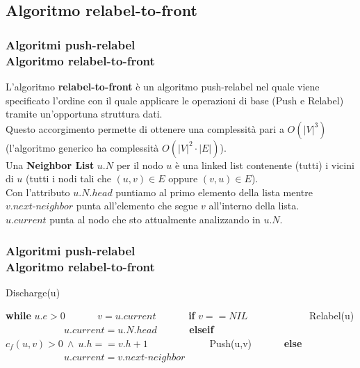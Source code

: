\documentclass{beamer}
\begin{document}
\subsection{Algoritmo relabel-to-front}

\begin{frame}
\frametitle{Algoritmi push-relabel\\Algoritmo relabel-to-front}
L'algoritmo \textbf{relabel-to-front} è un algoritmo push-relabel nel quale viene specificato l'ordine con il quale applicare le operazioni di base (Push e Relabel) tramite un'opportuna struttura dati.\\
Questo accorgimento permette di ottenere una complessità pari a $O(|V|^3)$ (l'algoritmo generico ha complessità $O(|V|^2\cdot|E|)$).\\
Una \textbf{Neighbor List} $u.N$ per il nodo $u$ è una linked list contenente (tutti) i vicini di $u$ (tutti i nodi tali che $(u,v)\in E$ oppure $(v,u)\in E$).\\
Con l'attributo $u.N.head$ puntiamo al primo elemento della lista mentre $v.next\mbox{-}neighbor$ punta all'elemento che segue $v$ all'interno della lista.\\
$u.current$ punta al nodo che sto attualmente analizzando in $u.N$.
\end{frame}

\begin{frame}
\frametitle{Algoritmi push-relabel\\Algoritmo relabel-to-front}
\begin{algorithm}[H]
    \caption{Discharge(u)}%
    \begin{algorithmic}[1]
        \State \textbf{while} $u.e>0$
        \State \ \ \ \ \ \ $v=u.current$
        \State \ \ \ \ \ \ \textbf{if} $v==NIL$
        \State \ \ \ \ \ \ \ \ \ \ \ \ Relabel(u)
        \State \ \ \ \ \ \ \ \ \ \ \ \ $u.current=u.N.head$
        \State \ \ \ \ \ \ \textbf{elseif} $c_f(u,v)>0\ \wedge\ u.h==v.h+1$
        \State \ \ \ \ \ \ \ \ \ \ \ \ Push(u,v)
        \State \ \ \ \ \ \ \textbf{else}
        \State \ \ \ \ \ \ \ \ \ \ \ \ $u.current=v.next\mbox{-}neighbor$
    \end{algorithmic}
    \label{alg_1}
\end{algorithm}
\end{frame}
\end{document}
